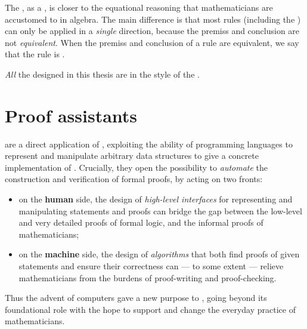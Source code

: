 \AP
The , as a , is closer to the
equational reasoning that mathematicians are accustomed to in algebra. The main
difference is that most rules (including the  ) can only
be applied in a \emph{single} direction, because the premiss and conclusion are
not \emph{equivalent}. When the premiss and conclusion of a rule are equivalent, we say
that the rule is .

\begin{emphpar}
\emph{All} the  designed in this thesis are 
 in the style of the .
\end{emphpar}

\section{Proof assistants}

 are a direct application of , exploiting the
ability of programming languages to represent and manipulate arbitrary data
structures to give a concrete implementation of . Crucially,
they open the possibility to \emph{automate} the construction and verification
of formal proofs, by acting on two fronts:
\begin{itemize}
  \item on the \textbf{human} side, the design of \emph{high-level interfaces}
  for representing and manipulating statements and proofs can bridge the gap
  between the low-level and very detailed proofs of formal logic, and the
  informal proofs of mathematicians;
  \item on the \textbf{machine} side, the design of \emph{algorithms} that both
  find proofs of given statements and ensure their correctness can --- to some
  extent --- relieve mathematicians from the
  burdens of proof-writing and proof-checking.
\end{itemize}
Thus the advent of computers gave a new purpose to , going beyond
its foundational role with the hope to support and change the everyday practice
of mathematicians.

